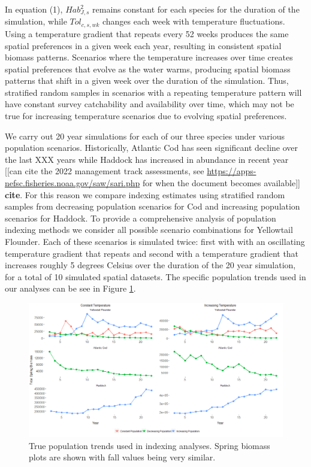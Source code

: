 \documentclass[
  12pt,
]{article}
\begin{document}
In equation (1), \(Hab^2_{J,s}\) remains constant for each species for the duration of the simulation, while \(Tol_{c,s,wk}\) changes each week with temperature fluctuations. Using a temperature gradient that repeats every 52 weeks produces the same spatial preferences in a given week each year, resulting in consistent spatial biomass patterns. Scenarios where the temperature increases over time creates spatial preferences that evolve as the water warms, producing spatial biomass patterns that shift in a given week over the duration of the simulation. Thus, stratified random samples in scenarios with a repeating temperature pattern will have constant survey catchability and availability over time, which may not be true for increasing temperature scenarios due to evolving spatial preferences.

We carry out 20 year simulations for each of our three species under various population scenarios. Historically, Atlantic Cod has seen significant decline over the last XXX years while Haddock has increased in abundance in recent year {[}{[}can cite the 2022 management track assessments, see \url{https://apps-nefsc.fisheries.noaa.gov/saw/sari.php} for when the document becomes available{]}{]} \textbf{cite}. For this reason we compare indexing estimates using stratified random samples from decreasing population scenarios for Cod and increasing population scenarios for Haddock. To provide a comprehensive analysis of population indexing methods we consider all possible scenario combinations for Yellowtail Flounder. Each of these scenarios is simulated twice: first with with an oscillating temperature gradient that repeats and second with a temperature gradient that increases roughly 5 degrees Celsius over the duration of the 20 year simulation, for a total of 10 simulated spatial datasets. The specific population trends used in our analyses can be see in Figure \ref{fig:pop-scenarios}.

\begin{figure}

{\centering \includegraphics[width=0.99\linewidth]{Images/Population_scenarios} 

}

\caption{True population trends used in indexing analyses. Spring biomass plots are shown with fall values being very similar.}\label{fig:pop-scenarios}
\end{figure}
\end{document}
